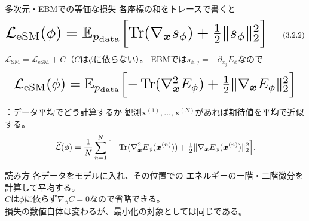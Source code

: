 \asmain
\begin{frame}{多次元・EBMでの等価な損失}
    各座標の和をトレースで書くと
    \[
        \resizebox{0.98\textwidth}{!}{$
        \mathcal{L}_{\mathrm{eSM}}(\phi)
        =
        \mathbb{E}_{p_{\mathrm{data}}}
        \Bigl[
        \operatorname{Tr}(\nabla_{\bm{x}}s_\phi)
        +
        \tfrac12\|s_\phi\|_2^2
        \Bigr]
        $}
        \tag{3.2.2}
    \]
    $\mathcal{L}_{\mathrm{SM}}=\mathcal{L}_{\mathrm{eSM}}+C$（$C$は$\phi$に依らない）。
    EBMでは$s_{\phi,j}=-\partial_{x_j}E_\phi$なので
    \[
        \resizebox{0.98\textwidth}{!}{$
        \mathcal{L}_{\mathrm{eSM}}(\phi)
        =
        \mathbb{E}_{p_{\mathrm{data}}}
        \Bigl[
        -\operatorname{Tr}(\nabla_{\bm{x}}^{2}E_\phi)
        +
        \tfrac12\|\nabla_{\bm{x}}E_\phi\|_2^2
        \Bigr]
        $}
    \]
\end{frame}
\assuppl
\begin{frame}{\supplmark：データ平均でどう計算するか}
    観測$\bm{x}^{(1)},\ldots,\bm{x}^{(N)}$があれば期待値を平均で近似する。
    \[
        \widehat{\mathcal{L}}(\phi)
        =
        \frac1N\sum_{n=1}^{N}
        \Bigl[
        -\operatorname{Tr}(\nabla_{\bm{x}}^{2}E_\phi(\bm{x}^{(n)}))
        +
        \tfrac12\|\nabla_{\bm{x}}E_\phi(\bm{x}^{(n)})\|_2^2
        \Bigr].
    \]
    \begin{exampleblock}{読み方}
        各データをモデルに入れ、その位置での
        エネルギーの一階・二階微分を計算して平均する。\\
        $C$は$\phi$に依らず$\nabla_\phi C=0$なので省略できる。\\
        損失の数値自体は変わるが、最小化の対象としては同じである。
    \end{exampleblock}
\end{frame}
\assuppl
